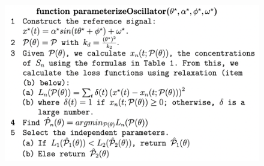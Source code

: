 \documentclass{bmcart}
\newcommand{\tab}[1]{Table~\ref{#1}}
\begin{document}
\begin{backmatter}
\begin{figure}
\centering
         \includegraphics[scale=0.5]{figures/Figure_2.png}
%






\end{figure}
\end{backmatter}
\end{document}
